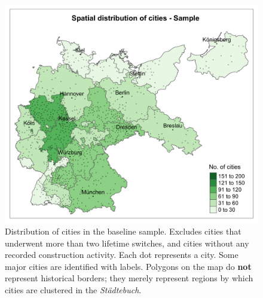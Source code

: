 \documentclass[11pt, a4paper]{article}
\begin{document}
\begin{figure}[ht]
    \centering
    \includegraphics[scale=0.15]{paper/output/descriptive/map_cities_sample.png}
    \caption{Distribution of cities in the baseline sample. Excludes cities that underwent more than two lifetime switches, and cities without any recorded construction activity. Each dot represents a city. Some major cities are identified with labels. Polygons on the map do \textbf{not} represent historical borders; they merely represent regions by which cities are clustered in the \textit{Städtebuch}.}
    \label{fig:map_cities_sample}
\end{figure}
\end{document}
